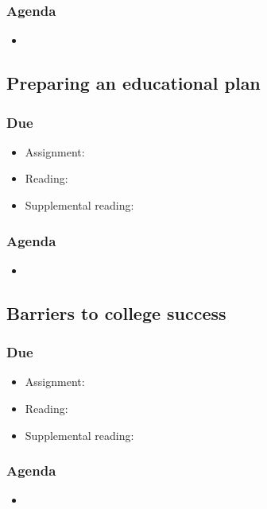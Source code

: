 \documentclass[12pt,article,oneside]{memoir}
\begin{document}
\subsubsection{Agenda}
\begin{itemize}
\item 
\end{itemize} 

\subsection{Preparing an educational plan}
\subsubsection{Due}
\begin{itemize}
 \item Assignment: 
 \item Reading:
 \item Supplemental reading:
\end{itemize}

\subsubsection{Agenda}
\begin{itemize}
\item 
\end{itemize}


\subsection{Barriers to college success}
\subsubsection{Due}
\begin{itemize}
 \item Assignment: \cite{guillory2008s}
 \item Reading: \cite{rosenberg}
 \item Supplemental reading:
\end{itemize}

\subsubsection{Agenda}
\begin{itemize}
\item 
\end{itemize}
\end{document}
